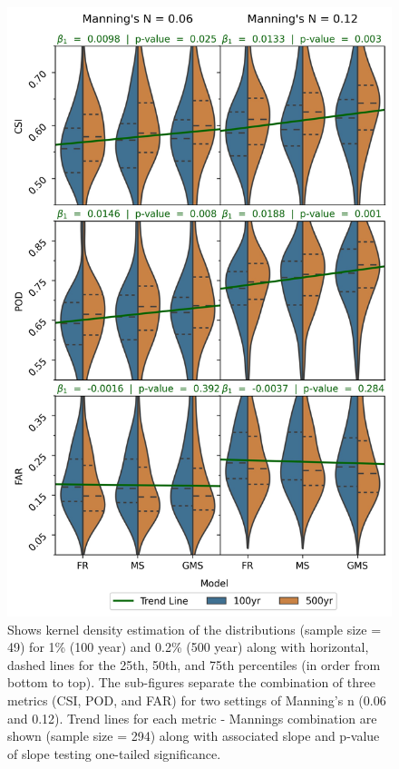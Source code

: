 \documentclass[draft]{dependencies/agujournal2019}
\begin{document}
\begin{figure}[H]
\centering
\includegraphics[scale=0.9]{figures/violin_plots.jpg}
\caption{Shows kernel density estimation of the distributions (sample size = 49) for 1\% (100 year) and 0.2\% (500 year) along with horizontal, dashed lines for the 25th, 50th, and 75th percentiles (in order from bottom to top).
The sub-figures separate the combination of three metrics (CSI, POD, and FAR) for two settings of Manning's n (0.06 and 0.12).
Trend lines for each metric - Mannings combination are shown (sample size = 294) along with associated slope and p-value of slope testing one-tailed significance.}
\label{fig:violin_plot}
\end{figure}
%
\end{document}
